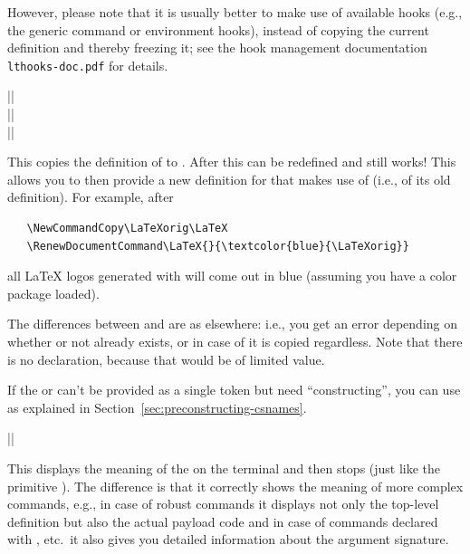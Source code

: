\documentclass{ltxguide}
\begin{document}
However, please note that it is usually better to make use of
available hooks (e.g., the generic command or environment hooks),
instead of copying the current definition and thereby freezing it; see
the hook management documentation \texttt{lthooks-doc.pdf} for
details.

\begin{decl}
  |\NewCommandCopy|         \\
  |\RenewCommandCopy|       \\
  |\DeclareCommandCopy|    
\end{decl}

This copies the definition of  to . After
this  can be redefined and 
still works! This allows you to then provide a new definition for
 that makes use of  (i.e., of its old
definition). For example, after
\begin{verbatim}
   \NewCommandCopy\LaTeXorig\LaTeX
   \RenewDocumentCommand\LaTeX{}{\textcolor{blue}{\LaTeXorig}}
\end{verbatim}
all \LaTeX{} logos generated with  will come out in blue
(assuming you have a color package loaded).

The differences between  and  are as
elsewhere: i.e., you get an error depending on whether or not
 already exists, or in case of  it is copied
regardless. Note that there is no  declaration, because
that would be of limited value.


If the  or  can't be provided as a single
token but need \enquote{constructing}, you can use 
as explained in
Section~\ref{sec:preconstructing-csnames}.

\begin{decl}
  |\ShowCommand|       
\end{decl}

This displays the meaning of the  on the terminal and then
stops (just like the primitive ). The difference is that it
correctly shows the meaning of more complex commands, e.g., in case of
robust commands it displays not only the top-level definition but
also the actual payload code and in case of commands declared with
, etc.\ it also gives you detailed information
about the argument signature.
\end{document}
